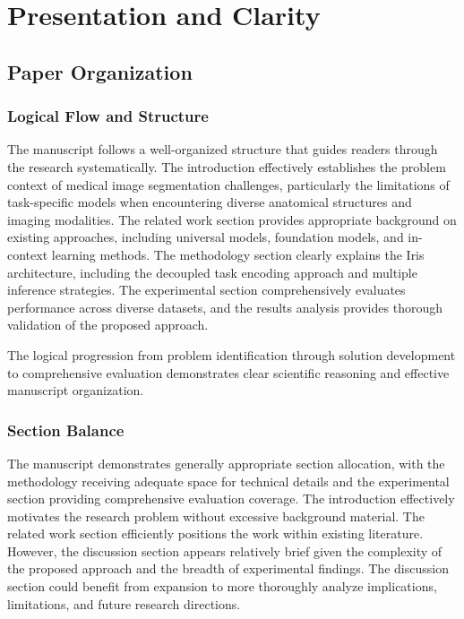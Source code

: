 \section{Presentation and Clarity}
\label{sec:presentation_clarity}

\subsection{Paper Organization}
\subsubsection{Logical Flow and Structure}
The manuscript follows a well-organized structure that guides readers through the research systematically. The introduction effectively establishes the problem context of medical image segmentation challenges, particularly the limitations of task-specific models when encountering diverse anatomical structures and imaging modalities. The related work section provides appropriate background on existing approaches, including universal models, foundation models, and in-context learning methods. The methodology section clearly explains the Iris architecture, including the decoupled task encoding approach and multiple inference strategies. The experimental section comprehensively evaluates performance across diverse datasets, and the results analysis provides thorough validation of the proposed approach.

The logical progression from problem identification through solution development to comprehensive evaluation demonstrates clear scientific reasoning and effective manuscript organization.

\subsubsection{Section Balance}
The manuscript demonstrates generally appropriate section allocation, with the methodology receiving adequate space for technical details and the experimental section providing comprehensive evaluation coverage. The introduction effectively motivates the research problem without excessive background material. The related work section efficiently positions the work within existing literature. However, the discussion section appears relatively brief given the complexity of the proposed approach and the breadth of experimental findings. The discussion section could benefit from expansion to more thoroughly analyze implications, limitations, and future research directions.

